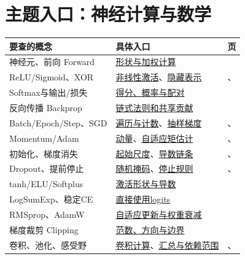 \section{主题入口：神经计算与数学}
\begingroup
\setlength{\LTpre}{3pt}\setlength{\LTpost}{4pt}
\small
\begin{xltabular}{\textwidth}{P{52mm}Y r}
\toprule
要查的概念 & 具体入口 & 页\\
\midrule
\endhead
\bottomrule
\endfoot
神经元、前向 Forward & \hyperref[sec:nn-forward]{形状与加权计算} & \pageref{sec:nn-forward}\\
ReLU/Sigmoid、XOR & \hyperref[sec:nn-activations]{非线性激活}、\hyperref[sec:nn-xor]{隐藏表示} & \pageref{sec:nn-activations}、\pageref{sec:nn-xor}\\
Softmax与输出/损失 & \hyperref[sec:nn-softmax]{得分、概率与配对} & \pageref{sec:nn-softmax}\\
反向传播 Backprop & \hyperref[sec:nn-backprop]{链式法则和共享贡献} & \pageref{sec:nn-backprop}\\
Batch/Epoch/Step、SGD & \hyperref[sec:train-batches]{遍历与计数}、\hyperref[sec:train-sgd]{抽样梯度} & \pageref{sec:train-batches}、\pageref{sec:train-sgd}\\
Momentum/Adam & \hyperref[sec:train-momentum]{动量}、\hyperref[sec:train-adam]{自适应矩估计} & \pageref{sec:train-momentum}、\pageref{sec:train-adam}\\
初始化、梯度消失 & \hyperref[sec:train-initialization]{起始尺度}、\hyperref[sec:train-vanishing]{导数链条} & \pageref{sec:train-initialization}、\pageref{sec:train-vanishing}\\
Dropout、提前停止 & \hyperref[sec:train-dropout]{随机掩码}、\hyperref[sec:train-early-stopping]{停止规则} & \pageref{sec:train-dropout}、\pageref{sec:train-early-stopping}\\
tanh/ELU/Softplus & \hyperref[sec:numeric-activation]{激活形状与导数} & \pageref{sec:numeric-activation}\\
LogSumExp、稳定CE & \hyperref[sec:numeric-logits]{直接使用logits} & \pageref{sec:numeric-logits}\\
RMSprop、AdamW & \hyperref[sec:numeric-decay]{自适应更新与权重衰减} & \pageref{sec:numeric-decay}\\
梯度裁剪 Clipping & \hyperref[sec:numeric-clipping]{范数、方向与边界} & \pageref{sec:numeric-clipping}\\
卷积、池化、感受野 & \hyperref[sec:cnn-convolution]{卷积计算}、\hyperref[sec:cnn-pooling]{汇总与依赖范围} & \pageref{sec:cnn-convolution}、\pageref{sec:cnn-pooling}\\

\end{xltabular}
